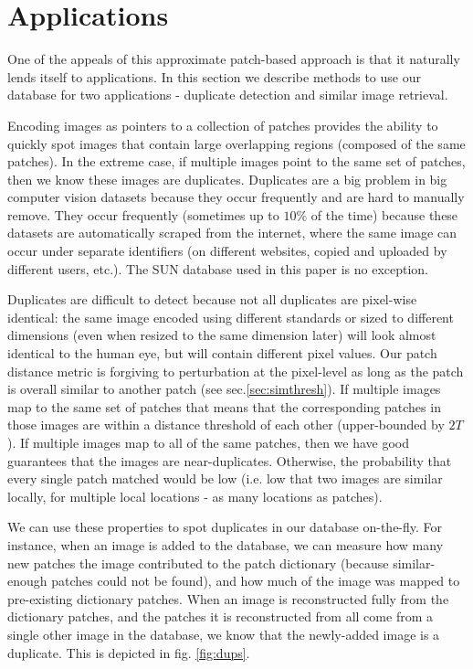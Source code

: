 \section{Applications}\label{sec:apps}

One of the appeals of this approximate patch-based approach
is that it naturally lends itself to applications. In this
section we describe methods to use our database for
two applications - duplicate detection and similar image retrieval.


Encoding images as pointers to a collection of patches provides the ability to quickly spot images that contain large overlapping regions (composed of the same patches). In the extreme case, if multiple images point to the same set of patches, then we know these images are duplicates. Duplicates are a big problem in big computer vision datasets because they occur frequently and are hard to manually remove. They occur frequently (sometimes up to $10\%$ of the time) because these datasets are automatically scraped from the internet, where the same image can occur under separate identifiers (on different websites, copied and uploaded by different users, etc.). The SUN database \cite{SUN} used in this paper is no exception.

Duplicates are difficult to detect because not all duplicates are pixel-wise identical: the same image encoded using different standards or sized to different dimensions (even when resized to the same dimension later) will look almost identical to the human eye, but will contain different pixel values. Our patch distance metric is forgiving to perturbation at the pixel-level as long as the patch is overall similar to another patch (see sec.\ref{sec:simthresh}). If multiple images map to the same set of patches that means that the corresponding patches in those images are within a distance threshold of each other (upper-bounded by $2T$). If multiple images map to all of the same patches, then we have good guarantees that the images are near-duplicates. Otherwise, the probability that every single patch matched would be low (i.e. low that two images are similar locally, for multiple local locations - as many locations as patches). 

We can use these properties to spot duplicates in our database on-the-fly. For instance, when an image is added to the database, we can measure how many new patches the image contributed to the patch dictionary (because similar-enough patches could not be found), and how much of the image was mapped to pre-existing dictionary patches. When an image is reconstructed fully from the dictionary patches, and the patches it is reconstructed from all come from a single other image in the database, we know that the newly-added image is a duplicate. This is depicted in fig. \ref{fig:dups}. 

